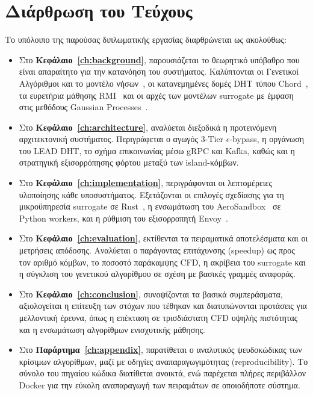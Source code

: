 \section{Διάρθρωση του Τεύχους}
\label{sec:intro_structure}

Το υπόλοιπο της παρούσας διπλωματικής εργασίας διαρθρώνεται ως ακολούθως:

\begin{itemize}
    \item Στο \textbf{Κεφάλαιο~\ref{ch:background}}, παρουσιάζεται το θεωρητικό υπόβαθρο που είναι απαραίτητο για την κατανόηση του συστήματος. Καλύπτονται οι Γενετικοί Αλγόριθμοι και το μοντέλο νήσων~\cite{whitley1999island,cantupaz2000parallel}, οι κατανεμημένες δομές DHT τύπου Chord~\cite{stoica2001chord}, τα ευρετήρια μάθησης RMI~\cite{kraska2018case} και οι αρχές των μοντέλων surrogate με έμφαση στις μεθόδους Gaussian Processes~\cite{jones1998ego,forrester2008engineering}.

    \item Στο \textbf{Κεφάλαιο~\ref{ch:architecture}}, αναλύεται διεξοδικά η προτεινόμενη αρχιτεκτονική συστήματος. Περιγράφεται ο αγωγός 3-Tier $\epsilon$-bypass, η οργάνωση του LEAD DHT, το σχήμα επικοινωνίας μέσω gRPC και Kafka, καθώς και η στρατηγική εξισορρόπησης φόρτου μεταξύ των island-κόμβων.

    \item Στο \textbf{Κεφάλαιο~\ref{ch:implementation}}, περιγράφονται οι λεπτομέρειες υλοποίησης κάθε υποσυστήματος. Εξετάζονται οι επιλογές σχεδίασης για τη μικροϋπηρεσία surrogate σε Rust~\cite{matsakis2014rust}, η ενσωμάτωση του AeroSandbox~\cite{sharpe2021aerosandbox} σε Python workers, και η ρύθμιση του εξισορροπητή Envoy~\cite{klein2017envoy}.

    \item Στο \textbf{Κεφάλαιο~\ref{ch:evaluation}}, εκτίθενται τα πειραματικά αποτελέσματα και οι μετρήσεις απόδοσης. Αναλύεται ο παράγοντας επιτάχυνσης (speedup) ως προς τον αριθμό κόμβων, το ποσοστό παράκαμψης CFD, η ακρίβεια του surrogate και η σύγκλιση του γενετικού αλγορίθμου σε σχέση με βασικές γραμμές αναφοράς.

    \item Στο \textbf{Κεφάλαιο~\ref{ch:conclusion}}, συνοψίζονται τα βασικά συμπεράσματα, αξιολογείται η επίτευξη των στόχων που τέθηκαν και διατυπώνονται προτάσεις για μελλοντική έρευνα, όπως η επέκταση σε τρισδιάστατη CFD υψηλής πιστότητας και η ενσωμάτωση αλγορίθμων ενισχυτικής μάθησης.

    \item Στο \textbf{Παράρτημα~\ref{ch:appendix}}, παρατίθεται ο αναλυτικός ψευδοκώδικας των κρίσιμων αλγορίθμων, μαζί με οδηγίες αναπαραγωγιμότητας (reproducibility). Το σύνολο του πηγαίου κώδικα διατίθεται ανοικτά, ενώ παρέχεται πλήρες περιβάλλον Docker για την εύκολη αναπαραγωγή των πειραμάτων σε οποιοδήποτε σύστημα.
\end{itemize}


